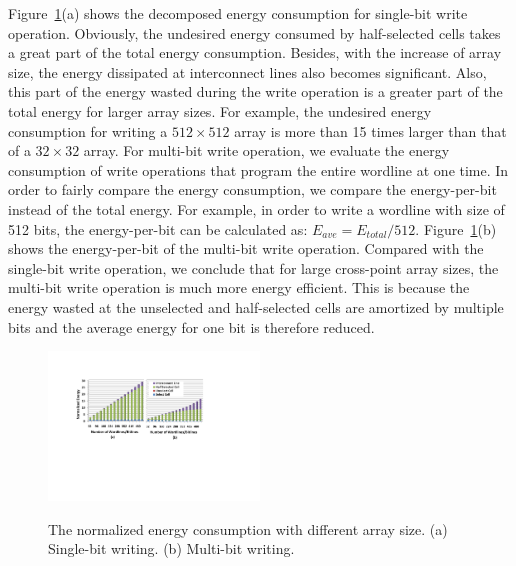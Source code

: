 Figure~\ref{fig:energy}(a) shows the decomposed energy consumption for
single-bit write operation. Obviously, the undesired energy consumed by
half-selected cells takes a great part of the total energy consumption.
Besides, with the increase of array size, the energy dissipated at
interconnect lines also becomes significant. Also, this part of the energy
wasted during the write operation is a greater part of the total energy
for larger array sizes. For example, the undesired energy consumption for
writing a $512{\times}512$ array is more than 15 times larger than that of
a $32{\times}32$ array. For multi-bit write operation, we evaluate the
energy consumption of write operations that program the entire wordline at
one time. In order to fairly compare the energy consumption, we compare
the energy-per-bit instead of the total energy. For example, in order to
write a wordline with size of 512 bits, the energy-per-bit can be
calculated as: $E_{ave}=E_{total}/512$. Figure~\ref{fig:energy}(b) shows
the energy-per-bit of the multi-bit write operation. Compared with the
single-bit write operation, we conclude that for large cross-point array
sizes, the multi-bit write operation is much more energy efficient. This
is because the energy wasted at the unselected and half-selected cells are
amortized by multiple bits and the average energy for one bit is therefore
reduced.

\begin{figure}%
\centering
  \includegraphics[width=0.5\textwidth]{./figures/energy_f_tall2.pdf}\\
  \caption{The normalized energy consumption with different array size. (a) Single-bit writing. (b) Multi-bit writing.}\label{fig:energy}
    \vspace{-5pt}
\end{figure}


